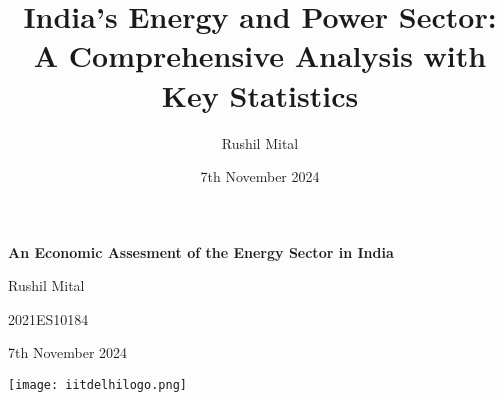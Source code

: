 \documentclass[12pt]{article}
\begin{document}
\title{India's Energy and Power Sector: A Comprehensive Analysis with Key Statistics}
\author{Rushil Mital}
\date{7th November 2024}
\begin{titlepage}
    \centering
    \vspace*{2cm}
    {\Huge\bfseries An Economic Assesment of the Energy Sector in India\par}
    \vspace{1cm}
    {\Large Rushil Mital\par}
    \vspace{1cm}
    {\Large 2021ES10184\par}
    \vspace{2cm}
    {\Large 7th November 2024\par}
    \vspace{1.5cm}
    \texttt{[image: iitdelhilogo.png]} %
    \vfill
\end{titlepage}

\tableofcontents
\newpage
\end{document}
